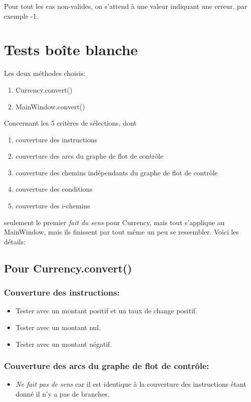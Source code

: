 \documentclass{article}
\begin{document}
Pour tout les cas non-valides, on s'attend à une valeur indiquant une erreur, par exemple -1.

\section{Tests boîte blanche}

Les deux méthodes choisis: 
\begin{enumerate}
    \item Currency.convert()
    \item MainWindow.convert()
\end{enumerate}
Concernant les 5 critères de sélections, dont 
\begin{enumerate}
    \item couverture des instructions
    \item couverture des arcs du graphe de flot de contrôle
    \item couverture des chemins indépendants du graphe de flot de contrôle
    \item couverture des conditions
    \item couverture des i-chemins
\end{enumerate}

seulement le premier \textit{fait du sens} pour Currency, mais tout s'applique au MainWindow, mais ils finissent par tout même un peu se ressembler. Voici les détails:




\subsection{Pour Currency.convert()}
\subsubsection{Couverture des instructions:}

\begin{itemize}
    \item Tester avec un montant positif et un taux de change positif.
    \item Tester avec un montant nul.
    \item Tester avec un montant négatif.
\end{itemize}

\subsubsection{Couverture des arcs du graphe de flot de contrôle:}
\begin{itemize}
    \item \textit{Ne fait pas de sens} car il est identique à la couverture des instructions étant donné il n'y a pas de branches.
\end{itemize}
\end{document}
